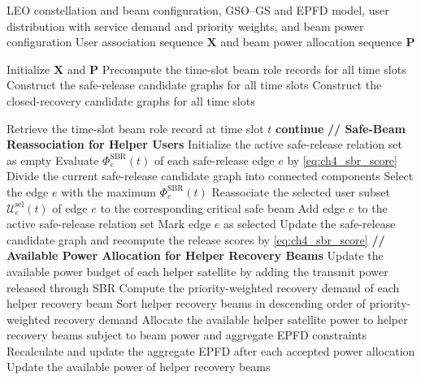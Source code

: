 \begin{algorithm}[H]
\caption{Overall Procedure of EPFD-Aware Beam Reassociation for Service Recovery}
\label{alg:ch4_overall}
\scriptsize
\begin{algorithmic}[1]
\Require LEO constellation and beam configuration, GSO--GS and EPFD model, user distribution with service demand and priority weights, and beam power configuration
\Ensure User association sequence $\mathbf{X}$ and beam power allocation sequence $\mathbf{P}$

\State Initialize $\mathbf{X}$ and $\mathbf{P}$
\State Precompute the time-slot beam role records for all time slots
\State Construct the safe-release candidate graphs for all time slots
\State Construct the closed-recovery candidate graphs for all time slots

    \State Retrieve the time-slot beam role record at time slot $t$
        \State \textbf{continue}
    \EndIf
    \State \textbf{// Safe-Beam Reassociation for Helper Users}
    \State Initialize the active safe-release relation set as empty
    \State Evaluate $\Phi_e^{\mathrm{SBR}}(t)$ of each safe-release edge $e$ by \eqref{eq:ch4_sbr_score}
        \State Divide the current safe-release candidate graph into connected components
            \State Select the edge $e$ with the maximum $\Phi_e^{\mathrm{SBR}}(t)$
            \State Reassociate the selected user subset $\mathcal{U}_e^{\mathrm{sel}}(t)$ of edge $e$ to the corresponding critical safe beam
            \State Add edge $e$ to the active safe-release relation set
            \State Mark edge $e$ as selected
        \EndFor
        \State Update the safe-release candidate graph and recompute the release scores by \eqref{eq:ch4_sbr_score}
    \EndWhile
    \State \textbf{// Available Power Allocation for Helper Recovery Beams}
    \State Update the available power budget of each helper satellite by adding the transmit power released through SBR
    \State Compute the priority-weighted recovery demand of each helper recovery beam
    \State Sort helper recovery beams in descending order of priority-weighted recovery demand
    \State Allocate the available helper satellite power to helper recovery beams subject to beam power and aggregate EPFD constraints
    \State Recalculate and update the aggregate EPFD after each accepted power allocation
    \State Update the available power of helper recovery beams

\end{algorithmic}
\end{algorithm}
